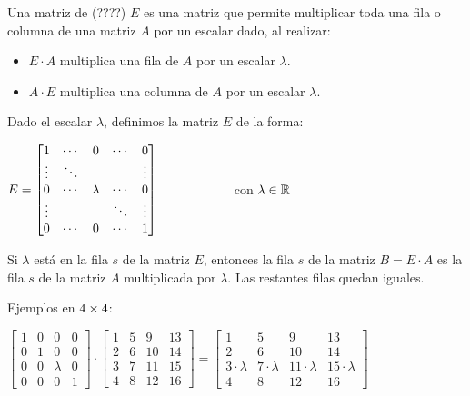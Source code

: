 \documentclass[]{article}
\begin{document}
Una matriz de (????) $E$ es una matriz que permite multiplicar toda una fila o columna de una matriz $A$ por un escalar dado, al realizar:
\begin{itemize}
	\item $E\cdot A$ multiplica una fila de $A$ por un escalar $\lambda$.
	\item $A\cdot E$ multiplica una columna de $A$ por un escalar $\lambda$.
\end{itemize}

Dado el escalar $\lambda$, definimos la matriz $E$ de la forma:
\begin{center}
	$E=\begin{bmatrix}
		1 & \cdots & 0 & \cdots & 0 \\
		\vdots  & \ddots &   &        & \vdots  \\
		0 & \cdots & \lambda & \cdots & 0\\
		\vdots & & &\ddots & \vdots \\
		0&\cdots & 0 & \cdots & 1
	\end{bmatrix} \hspace{2cm}$ con $\lambda\in\mathbb{R}$
\end{center}


Si $\lambda$ está en la fila $s$ de la matriz $E$, entonces la fila $s$ de la matriz $B = E \cdot A$ es la fila $s$ de la matriz $A$ multiplicada por $\lambda$. Las restantes filas quedan iguales.

Ejemplos en $4\times 4$:
\begin{center}
	$\begin{bmatrix}
		1&0&0&0 \\
		0&1&0&0 \\
		0&0&\lambda&0 \\
		0&0&0&1
	\end{bmatrix} \cdot
	\begin{bmatrix}
		1&5&9&13 \\
		2&6&10&14 \\
		3&7&11&15 \\
		4&8&12&16
	\end{bmatrix} =
	\begin{bmatrix}
		1&5&9&13 \\
		2&6&10&14 \\
		3\cdot\lambda&7\cdot\lambda&11\cdot\lambda&15\cdot\lambda \\
		4&8&12&16
	\end{bmatrix}
	$
\end{center}
\end{document}
